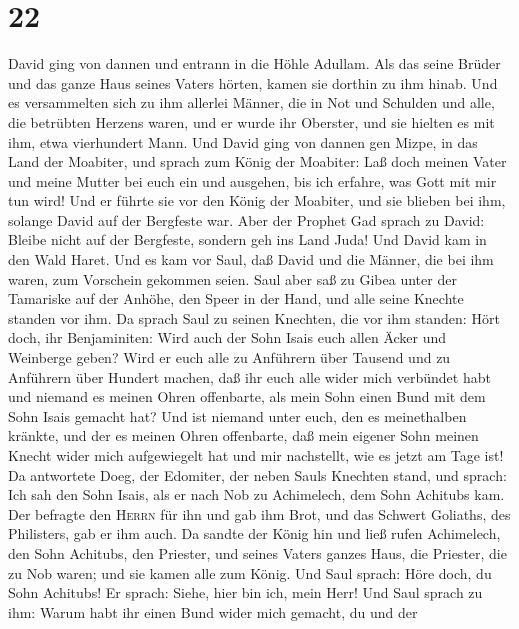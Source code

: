 \hypertarget{section-21}{%
\section{22}\label{section-21}}

 David ging von dannen und entrann in die Höhle Adullam.
Als das seine Brüder und das ganze Haus seines Vaters hörten, kamen sie
dorthin zu ihm hinab.  Und es versammelten sich zu ihm
allerlei Männer, die in Not und Schulden und alle, die betrübten Herzens
waren, und er wurde ihr Oberster, und sie hielten es mit ihm, etwa
vierhundert Mann.  Und David ging von dannen gen Mizpe, in
das Land der Moabiter, und sprach zum König der Moabiter: Laß doch
meinen Vater und meine Mutter bei euch ein und ausgehen, bis ich
erfahre, was Gott mit mir tun wird!  Und er führte sie vor
den König der Moabiter, und sie blieben bei ihm, solange David auf der
Bergfeste war.  Aber der Prophet Gad sprach zu David:
Bleibe nicht auf der Bergfeste, sondern geh ins Land Juda! Und David kam
in den Wald Haret.  Und es kam vor Saul, daß David und die
Männer, die bei ihm waren, zum Vorschein gekommen seien. Saul aber saß
zu Gibea unter der Tamariske auf der Anhöhe, den Speer in der Hand, und
alle seine Knechte standen vor ihm.  Da sprach Saul zu
seinen Knechten, die vor ihm standen: Hört doch, ihr Benjaminiten: Wird
auch der Sohn Isais euch allen Äcker und Weinberge geben? Wird er euch
alle zu Anführern über Tausend und zu Anführern über Hundert machen,
 daß ihr euch alle wider mich verbündet habt und niemand
es meinen Ohren offenbarte, als mein Sohn einen Bund mit dem Sohn Isais
gemacht hat? Und ist niemand unter euch, den es meinethalben kränkte,
und der es meinen Ohren offenbarte, daß mein eigener Sohn meinen Knecht
wider mich aufgewiegelt hat und mir nachstellt, wie es jetzt am Tage
ist!  Da antwortete Doeg, der Edomiter, der neben Sauls
Knechten stand, und sprach: Ich sah den Sohn Isais, als er nach Nob zu
Achimelech, dem Sohn Achitubs kam.  Der befragte den
\textsc{Herrn} für ihn und gab ihm Brot, und das Schwert Goliaths, des
Philisters, gab er ihm auch.  Da sandte der König hin und
ließ rufen Achimelech, den Sohn Achitubs, den Priester, und seines
Vaters ganzes Haus, die Priester, die zu Nob waren; und sie kamen alle
zum König.  Und Saul sprach: Höre doch, du Sohn Achitubs!
Er sprach: Siehe, hier bin ich, mein Herr!  Und Saul
sprach zu ihm: Warum habt ihr einen Bund wider mich gemacht, du und der
